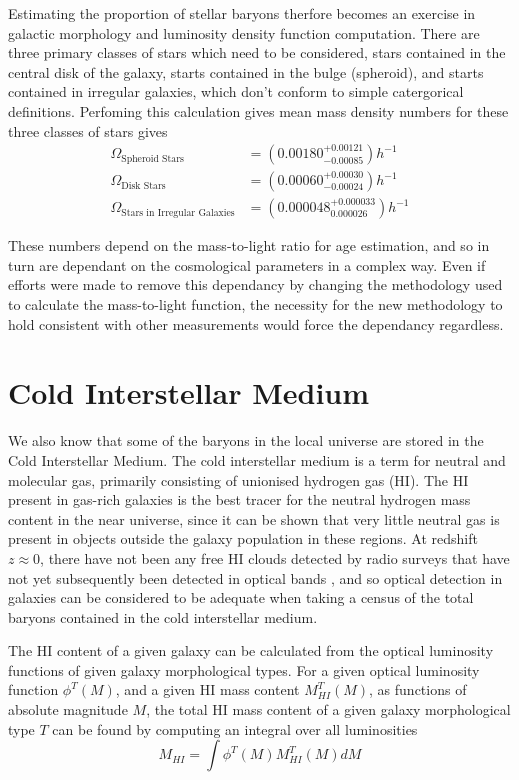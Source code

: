 \par Estimating the proportion of stellar baryons therfore becomes an exercise in galactic morphology and luminosity density function computation. There are three primary classes of stars which need to be considered, stars contained in the central disk of the galaxy, starts contained in the bulge (spheroid), and starts contained in irregular galaxies, which don't conform to simple catergorical definitions. Perfoming this calculation gives mean mass density numbers for these three classes of stars gives
\begin{align*}
\Omega_{\text{Spheroid Stars}} &= (0.00180^{+0.00121}_{-0.00085}) h^{-1} \\
\Omega_{\text{Disk Stars}} &= (0.00060^{+0.00030}_{-0.00024}) h^{-1} \\
\Omega_{\text{Stars in Irregular Galaxies}} &= (0.000048^{+0.000033}_{0.000026}) h^{-1}
\end{align*}

These numbers depend on the mass-to-light ratio for age estimation, and so in turn are dependant on the cosmological parameters in a complex way. Even if efforts were made to remove this dependancy by changing the methodology used to calculate the mass-to-light function, the necessity for the new methodology to hold consistent with other measurements would force the dependancy regardless.

\section{Cold Interstellar Medium}
We also know that some of the baryons in the local universe are stored in the Cold Interstellar Medium. The cold interstellar medium is a term for neutral and molecular gas, primarily consisting of unionised hydrogen gas (HI). The HI present in gas-rich galaxies is the best tracer for the neutral hydrogen mass content in the near universe, since it can be shown that very little neutral gas is present in objects outside the galaxy population in these regions. At redshift $z \approx 0$, there have not been any free HI clouds detected by radio surveys that have not yet subsequently been detected in optical bands \citep{1993ApJ...419..515R} , and so optical detection in galaxies can be considered to be adequate when taking a census of the total baryons contained in the cold interstellar medium. 
\par The HI content of a given galaxy can be calculated from the optical luminosity functions of given galaxy morphological types. For a given optical luminosity function $\phi^T(M)$, and a given HI mass content $M_{HI}^T(M)$, as functions of absolute magnitude $M$, the total HI mass content of a given galaxy morphological type $T$ can be found by computing an integral over all luminosities
$$M_{HI} = \int \phi^T(M) M_{HI}^T(M) dM $$

